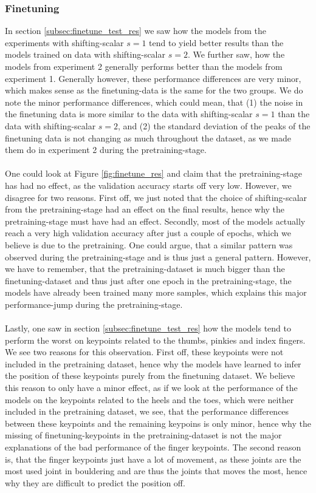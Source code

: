 \documentclass[./main.tex]{subfiles}
\begin{document}
\subsubsection{Finetuning}
In section \ref{subsec:finetune_test_res} we saw how the models from the experiments with shifting-scalar $s = 1$ tend to yield better results than the models trained on data with shifting-scalar $s = 2$. We further saw, how the models from experiment 2 generally performs better than the models from experiment 1. Generally however, these performance differences are very minor, which makes sense as the finetuning-data is the same for the two groups. We do note the minor performance differences, which could mean, that (1) the noise in the finetuning data is more similar to the data with shifting-scalar $s = 1$ than the data with shifting-scalar $s = 2$, and (2) the standard deviation of the peaks of the finetuning data is not changing as much throughout the dataset, as we made them do in experiment 2 during the pretraining-stage. 
\\
\\
One could look at Figure \ref{fig:finetune_res} and claim that the pretraining-stage has had no effect, as the validation accuracy starts off very low. However, we disagree for two reasons. First off, we just noted that the choice of shifting-scalar from the pretraining-stage had an effect on the final results, hence why the pretraining-stage must have had an effect. Secondly, most of the models actually reach a very high validation accuracy after just a couple of epochs, which we believe is due to the pretraining. One could argue, that a similar pattern was observed during the pretraining-stage and is thus just a general pattern. However, we have to remember, that the pretraining-dataset is much bigger than the finetuning-dataset and thus just after one epoch in the pretraining-stage, the models have already been trained many more samples, which explains this major performance-jump during the pretraining-stage.
\\
\\
Lastly, one saw in section \ref{subsec:finetune_test_res} how the models tend to perform the worst on keypoints related to the thumbs, pinkies and index fingers. We see two reasons for this observation. First off, these keypoints were not included in the pretraining dataset, hence why the models have learned to infer the position of these keypoints purely from the finetuning dataset. We believe this reason to only have a minor effect, as if we look at the performance of the models on the keypoints related to the heels and the toes, which were neither included in the pretraining dataset, we see, that the performance differences between these keypoints and the remaining keypoins is only minor, hence why the missing of finetuning-keypoints in the pretraining-dataset is not the major explanations of the bad performance of the finger keypoints. The second reason is, that the finger keypoints just have a lot of movement, as these joints are the most used joint in bouldering and are thus the joints that moves the most, hence why they are difficult to predict the position off.
\end{document}
